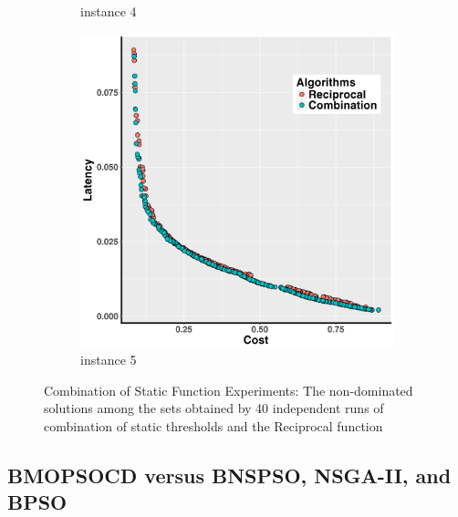\documentclass[10pt,journal,compsoc]{IEEEtran}
\begin{document}
\begin{figure}[h!]
\begin{subfigure}{0.49\linewidth}
    \caption{instance 4}
   \end{subfigure}
   \begin{subfigure}{0.49\linewidth}
       \includegraphics[width=\textwidth]{pics/combination_problem5.png}
    \caption{instance 5}
   \end{subfigure}
   \caption{Combination of Static Function Experiments:  The non-dominated solutions among
the sets obtained by 40 independent runs of combination of static thresholds and the Reciprocal function}
   \label{fig:combination}
\end{figure}

\vspace{-3 mm}
\subsection{BMOPSOCD versus BNSPSO, NSGA-II, and BPSO}
\end{document}
